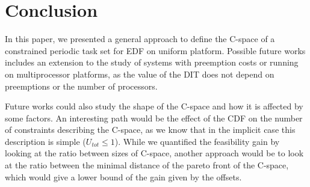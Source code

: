 \documentclass[conference]{IEEEtran}
\begin{document}
\section{Conclusion}

In this paper, we presented a general approach to define the C-space of a constrained periodic task set for EDF on uniform platform. Possible future works includes an extension to the study of systems with preemption costs or running on multiprocessor platforms, as the value of the DIT does not depend on preemptions or the number of processors.

Future works could also study the shape of the C-space and how it is affected by some factors. An interesting path would be the effect of the CDF on the number of constraints describing the C-space, as we know that in the implicit case this description is simple ($U_{tot} \leqslant 1$). While we quantified the feasibility gain by looking at the ratio between sizes of C-space, another approach would be to look at the ratio between the minimal distance of the pareto front of the C-space, which would give a lower bound of the gain given by the offsets.












%
%
%




\end{document}

